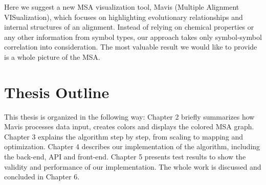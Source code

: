 Here we suggest a new MSA visualization tool, Mavis (Multiple Alignment VISualization), which focuses on highlighting evolutionary relationships and internal structures of an alignment. Instead of relying on chemical properties or any other information from symbol types, our approach takes only symbol-symbol correlation into consideration. The most valuable result we would like to provide is a whole picture of the MSA.

\section{Thesis Outline}

This thesis is organized in the following way: Chapter 2 briefly summarizes how Mavis processes data input, creates colors and displays the colored MSA graph. Chapter 3 explains the algorithm step by step, from scaling to mapping and optimization. Chapter 4 describes our implementation of the algorithm, including the back-end, API and front-end. Chapter 5 presents test results to show the validity and performance of our implementation. The whole work is discussed and concluded in Chapter 6.